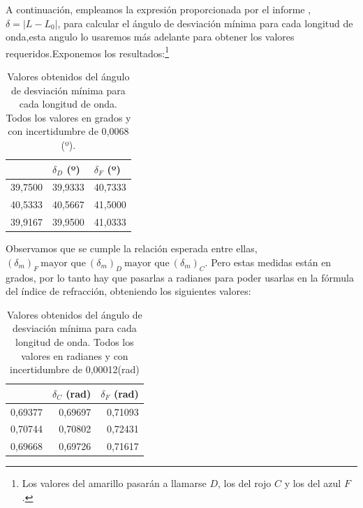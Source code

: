\documentclass[10pt,onecolumn]{article}
\begin{document}
A continuación, empleamos la expresión proporcionada por el informe \cite{InfoOpticaPrisma}, $\delta = |L - L_0|$, para calcular el ángulo de desviación mínima para cada longitud de onda,esta angulo lo usaremos más adelante para obtener los valores requeridos.Exponemos los resultados:\footnote{Los valores del amarillo pasarán a llamarse $D$, los del rojo $C$ y los del azul $F$.}
\begin{table}[H]
\centering
\begin{tabular}{|r|r|r|}
\hline
\rowcolor[rgb]{ .651,  .788,  .925}
\multicolumn{1}{|l|}{$\delta_C$ (º)} & \multicolumn{1}{l|}{$\delta_D$ (º)} & \multicolumn{1}{l|}{$\delta_F$ (º)} \\ \hline
\rowcolor[rgb]{.816,  .816,  .816}  39,7500 & 39,9333 & 40,7333 \\ \hline
\rowcolor[rgb]{.816,  .816,  .816} 40,5333  & 40,5667 & 41,5000 \\ \hline
\rowcolor[rgb]{.816,  .816,  .816} 39,9167& 39,9500  & 41,0333 \\ \hline
\end{tabular}
\caption{Valores obtenidos del ángulo de desviación mínima para cada longitud de onda. Todos los valores en grados y con incertidumbre de 0,0068 (º).}\label{tab:delta}
\end{table}


Observamos que se cumple la relación esperada entre ellas, $(\delta_m)_F\ \text{mayor que}\ (\delta_m)_D\ \text{mayor que}\ (\delta_m)_C$.
Pero estas medidas están en grados, por lo tanto hay que pasarlas a radianes para poder usarlas en la fórmula del índice de refracción, obteniendo los siguientes valores:

\begin{table}[H]
\centering
\begin{tabular}{|r|r|r|}
\hline
\rowcolor[rgb]{ .651,  .788,  .925}
\multicolumn{1}{|l|}{$\delta_D$ (rad)} & \multicolumn{1}{l|}{$\delta_C$ (rad)} & \multicolumn{1}{l|}{$\delta_F$ (rad)} \\ \hline
\rowcolor[rgb]{.816,  .816,  .816}0,69377 & 0,69697 & 0,71093 \\ \hline
\rowcolor[rgb]{.816,  .816,  .816}0,70744 & 0,70802 & 0,72431 \\ \hline
\rowcolor[rgb]{.816,  .816,  .816}0,69668 & 0,69726 & 0,71617 \\ \hline
\end{tabular}
\caption{Valores obtenidos del ángulo de desviación mínima para cada longitud de onda. Todos los valores en radianes y con incertidumbre de 0,00012(rad)}\label{tab:delta_rad}
\end{table}
\end{document}
